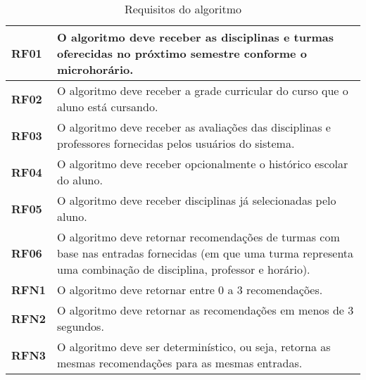 \begin{table}[!ht]
    \begin{center}
        \begin{tabular}{ | m{} | p{} | }  
            \hline
            \textbf{RF01} & O algoritmo deve receber as disciplinas e turmas oferecidas no próxtimo semestre conforme o microhorário.\tabularnewline\hline
            \textbf{RF02} & O algoritmo deve receber a grade curricular do curso que o aluno está cursando.\tabularnewline\hline
            \textbf{RF03} & O algoritmo deve receber as avaliações das disciplinas e professores fornecidas pelos usuários do sistema.\tabularnewline\hline
            \textbf{RF04} & O algoritmo deve receber opcionalmente o histórico escolar do aluno.\tabularnewline\hline
            \textbf{RF05} & O algoritmo deve receber disciplinas já selecionadas pelo aluno.\tabularnewline\hline
            \textbf{RF06} & O algoritmo deve retornar recomendações de turmas com base nas entradas fornecidas (em que uma turma representa uma combinação de disciplina, professor e horário).\tabularnewline\hline
            
            
            \textbf{RFN1} & O algoritmo deve retornar entre 0 a 3 recomendações.\tabularnewline\hline
            \textbf{RFN2} & O algoritmo deve retornar as recomendações em menos de 3 segundos.\tabularnewline\hline
            \textbf{RFN3} & O algoritmo deve ser determinístico, ou seja, retorna as mesmas recomendações para as mesmas entradas.\tabularnewline\hline
        \end{tabular}
    \end{center}
    \caption{Requisitos do algoritmo}
    
    \label{tab:req-algoritmo}
\end{table}


